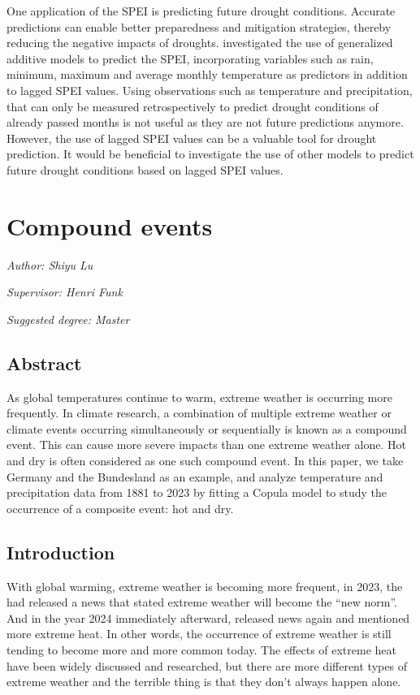 \documentclass[
]{krantz}
\begin{document}
One application of the SPEI is predicting future drought conditions. Accurate predictions can enable better preparedness and mitigation strategies, thereby reducing the negative impacts of droughts. \citet{mathivha2020} investigated the use of generalized additive models to predict the SPEI, incorporating variables such as rain, minimum, maximum and average monthly temperature as predictors in addition to lagged SPEI values.
Using observations such as temperature and precipitation, that can only be measured retrospectively to predict drought conditions of already passed months is not useful as they are not future predictions anymore. However, the use of lagged SPEI values can be a valuable tool for drought prediction.
It would be beneficial to investigate the use of other models to predict future drought conditions based on lagged SPEI values.

\chapter{Compound events}\label{ce}

\emph{Author: Shiyu Lu}

\emph{Supervisor: Henri Funk}

\emph{Suggested degree: Master}

\section{Abstract}\label{abstract-shiyu}

As global temperatures continue to warm, extreme weather is occurring more frequently. In climate research, a combination of multiple extreme weather or climate events occurring simultaneously or sequentially is known as a compound event. This can cause more severe impacts than one extreme weather alone. Hot and dry is often considered as one such compound event. In this paper, we take Germany and the Bundesland as an example, and analyze temperature and precipitation data from 1881 to 2023 by fitting a Copula model to study the occurrence of a composite event: hot and dry.

\section{Introduction}\label{intro-shiyu}

With global warming, extreme weather is becoming more frequent, in 2023, the \citet{wmo2023a} had released a news that stated extreme weather will become the ``new norm''. And in the year 2024 immediately afterward, \citet{wmo2024} released news again and mentioned more extreme heat. In other words, the occurrence of extreme weather is still tending to become more and more common today. The effects of extreme heat have been widely discussed and researched, but there are more different types of extreme weather and the terrible thing is that they don't always happen alone.
\end{document}
